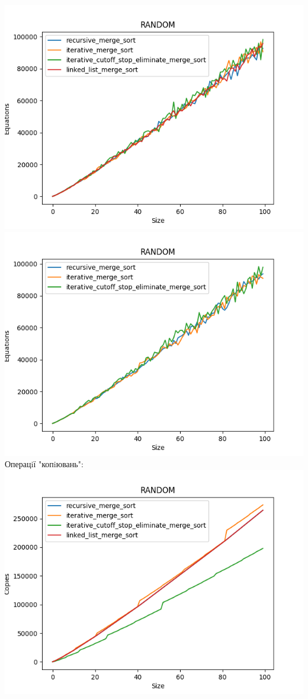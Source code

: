 \documentclass{article}
\begin{document}
            \includegraphics[scale=0.5]{random_Equations_4_sorts.png}
            \includegraphics[scale=0.5]{random_Equations_3_sorts.png}
        \newpage
        Операцiї "копiювань":
        \newline
            \includegraphics[scale=0.5]{random_Copies_4_sorts.png}
\end{document}
